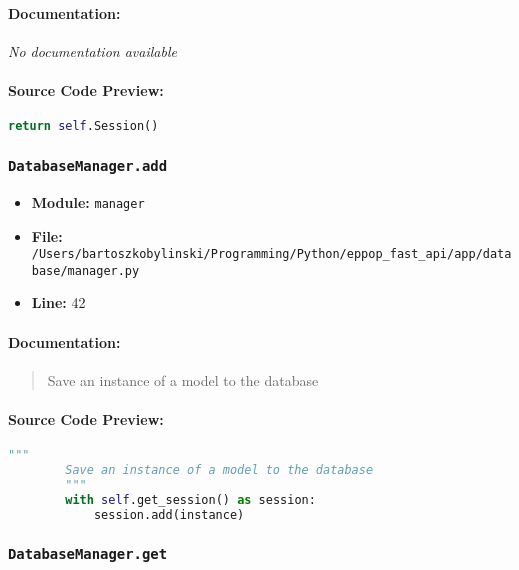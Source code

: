\documentclass[11pt,a4paper]{article}
\begin{document}
\paragraph{Documentation:} \textit{No documentation available}

\paragraph{Source Code Preview:}
\begin{lstlisting}[language=Python]
        return self.Session()
\end{lstlisting}

\vspace{1em}
\subsubsection{\texttt{DatabaseManager.add}}

\begin{itemize}
    \item \textbf{Module:} \texttt{manager}
    \item \textbf{File:} \texttt{/Users/bartoszkobylinski/Programming/Python/eppop\_fast\_api/app/database/manager.py}
    \item \textbf{Line:} 42
\end{itemize}

\paragraph{Documentation:}
\begin{quote}
Save an instance of a model to the database
\end{quote}

\paragraph{Source Code Preview:}
\begin{lstlisting}[language=Python]
        """
        Save an instance of a model to the database
        """
        with self.get_session() as session:
            session.add(instance)
\end{lstlisting}

\vspace{1em}
\subsubsection{\texttt{DatabaseManager.get}}
\end{document}

